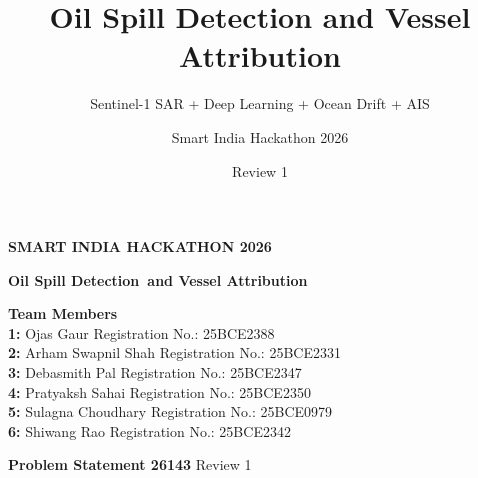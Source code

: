 \documentclass[aspectratio=169,11pt]{beamer}
\title{Oil Spill Detection and Vessel Attribution}
\subtitle{Sentinel-1 SAR + Deep Learning + Ocean Drift + AIS}
\author{Smart India Hackathon 2026}
\institute{Problem Statement 26143}
\date{Review 1}
\begin{document}
\begin{frame}[t]

\vspace{0.20cm}

{\Large\bfseries\color{blue}
SMART INDIA HACKATHON 2026}

\vspace{0.20cm}

{\fontsize{20}{25}\selectfont
\bfseries\color{navy}
Oil Spill Detection\
and Vessel Attribution\par}

\vspace{0.20cm}


\vspace{0.18cm}


\textbf{\color{navy}Team Members}\\
\textbf{1:} Ojas Gaur
\hfill Registration No.: 25BCE2388\\
\textbf{2:} Arham Swapnil Shah
\hfill Registration No.: 25BCE2331\\
\textbf{3:} Debasmith Pal
\hfill Registration No.: 25BCE2347\\
\textbf{4:} Pratyaksh Sahai
\hfill Registration No.: 25BCE2350\\
\textbf{5:} Sulagna Choudhary
\hfill Registration No.: 25BCE0979\\
\textbf{6:} Shiwang Rao
\hfill Registration No.: 25BCE2342

\vfill

\large
\textbf{Problem Statement 26143}
\hfill
\large Review 1

\end{frame}
\end{document}
